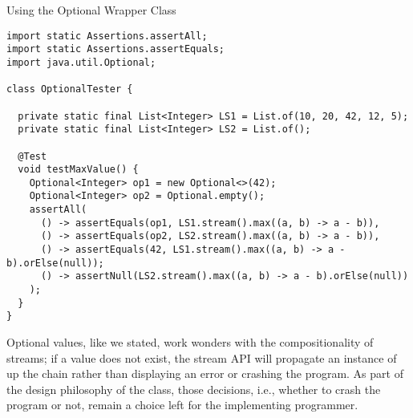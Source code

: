 
\begin{cl}{Using the Optional Wrapper Class}
\begin{lstlisting}[language=MyJava]
import static Assertions.assertAll;
import static Assertions.assertEquals;
import java.util.Optional;

class OptionalTester {

  private static final List<Integer> LS1 = List.of(10, 20, 42, 12, 5);
  private static final List<Integer> LS2 = List.of();

  @Test
  void testMaxValue() {
    Optional<Integer> op1 = new Optional<>(42);
    Optional<Integer> op2 = Optional.empty();
    assertAll(
      () -> assertEquals(op1, LS1.stream().max((a, b) -> a - b)),
      () -> assertEquals(op2, LS2.stream().max((a, b) -> a - b)),
      () -> assertEquals(42, LS1.stream().max((a, b) -> a - b).orElse(null));
      () -> assertNull(LS2.stream().max((a, b) -> a - b).orElse(null))
    );
  }
}
\end{lstlisting}
\end{cl}

Optional values, like we stated, work wonders with the compositionality of streams; if a value does not exist, the stream API will propagate an  instance of  up the chain rather than displaying an error or crashing the program. As part of the design philosophy of the class, those decisions, i.e., whether to crash the program or not, remain a choice left for the implementing programmer.